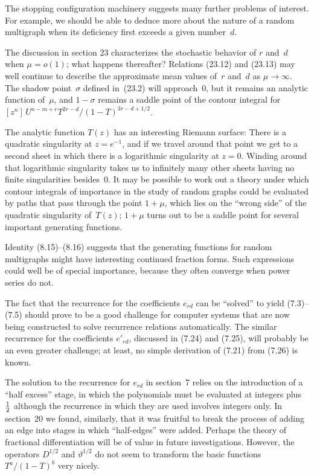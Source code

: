 The stopping configuration machinery suggests many further problems of
interest. For example, we should be able to deduce more about the nature
of a random multigraph when its deficiency first exceeds a given number~$d$.

The discussion in section 23
 characterizes the stochastic behavior of $r$ and~$d$
when $\mu=o(1)$; what happens 
thereafter? Relations (23.12) and (23.13) may well continue to
describe the approximate mean values of~$r$ and~$d$
 as $\mu\to\infty$. The shadow point~$\sigma$ defined in~(23.2) will
approach~0, but it remains an analytic function of~$\mu$, and $1-\sigma$
remains a saddle point of the contour integral for $[z^n]\,U^{n-m+r}
T^{2r-d}/(1-T)^{3r-d+1/2}$.

The analytic function $T(z)$ has an interesting Riemann surface: There is
a quadratic singularity at
 $z=e^{-1}$, and if we travel around that point we get
to a second sheet in which there is a logarithmic singularity at $z=0$.
Winding around that logarithmic singularity takes us to infinitely many other
sheets having no finite singularities besides~0. It may be possible to
work out a theory under which contour integrals of importance in the study
of random graphs could be evaluated by paths that pass through the point
$1+\mu$, which lies on the ``wrong side''
of the quadratic singularity of~$T(z)$; $1+\mu$ turns out
to be a saddle point for several important generating functions.

Identity (8.15)--(8.16) suggests that the generating functions for random
multigraphs might have interesting continued fraction forms. Such
expressions could well be of special importance, because they often converge
when power series do not.

The fact that the recurrence for the coefficients $e_{rd}$ can be ``solved''
to yield (7.3)--(7.5) should prove to be a good challenge for computer
systems that are now being constructed to solve recurrence relations
automatically. The similar recurrence for the coefficients
$e'_{rd}$, discussed in (7.24) and (7.25), will probably be an even greater
challenge; at least, no simple derivation of (7.21) from (7.26) 
is known. 

The solution to the recurrence for $e_{rd}$ in section~7 relies on the
introduction of a ``half excess'' stage, in which the polynomials must be
evaluated at integers plus~$1\over2$ although the recurrence in which
they are used involves integers only. In section~20 we found, similarly,
that it was fruitful to break the process of adding an edge into
stages in which ``half-edges'' were added. Perhaps the theory of
fractional differentiation will be of value in future investigations.
However, the operators $D^{1/2}$ and $\vartheta^{1/2}$ do not seem
to transform the basic functions $T^a\!/(1-T)^b$ very nicely.

